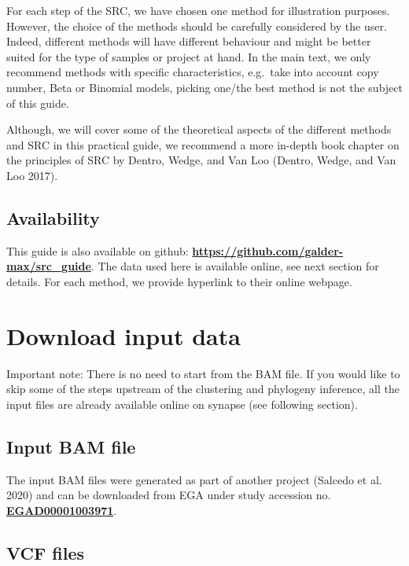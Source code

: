 \documentclass[]{article}
\begin{document}
For each step of the SRC, we have chosen one method for illustration
purposes. However, the choice of the methods should be carefully
considered by the user. Indeed, different methods will have different
behaviour and might be better suited for the type of samples or project
at hand. In the main text, we only recommend methods with specific
characteristics, e.g.~take into account copy number, Beta or Binomial
models, picking one/the best method is not the subject of this guide.

Although, we will cover some of the theoretical aspects of the different
methods and SRC in this practical guide, we recommend a more in-depth
book chapter on the principles of SRC by Dentro, Wedge, and Van Loo
(Dentro, Wedge, and Van Loo 2017).

\hypertarget{availability}{%
\subsection{Availability}\label{availability}}

This guide is also available on github:
\textbf{\url{https://github.com/galder-max/src_guide}}. The data used
here is available online, see next section for details. For each method,
we provide hyperlink to their online webpage.

\newpage

\hypertarget{download-input-data}{%
\section{Download input data}\label{download-input-data}}

Important note: There is no need to start from the BAM file. If you
would like to skip some of the steps upstream of the clustering and
phylogeny inference, all the input files are already available online on
synapse (see following section).

\hypertarget{input-bam-file}{%
\subsection{Input BAM file}\label{input-bam-file}}

The input BAM files were generated as part of another project (Salcedo
et al. 2020) and can be downloaded from EGA under study accession no.
\href{https://www.ebi.ac.uk/ega/studies/EGAS00001002092}{\textbf{EGAD00001003971}}.

\hypertarget{vcf-files}{%
\subsection{VCF files}\label{vcf-files}}
\end{document}
